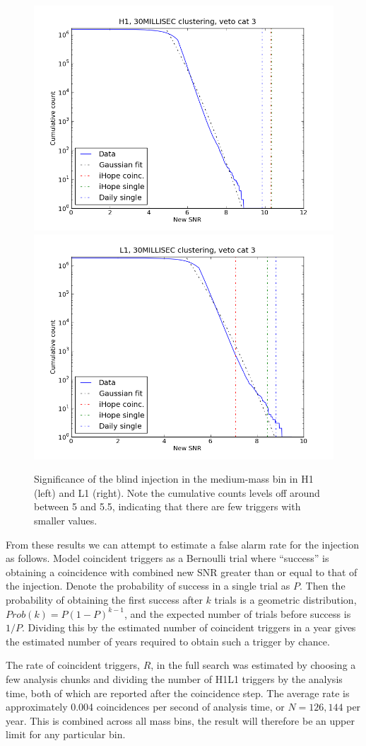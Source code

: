 \begin{figure}
  \includegraphics[width=0.5\linewidth]{figures/detchar/MM_H1_30MILLISEC_3_hist.png}
  \includegraphics[width=0.5\linewidth]{figures/detchar/MM_L1_30MILLISEC_3_hist.png}
  \caption[Significance of the injection in the medium-mass bin]{
  \label{f:daily_histogram_medium}
Significance of the blind injection in the medium-mass bin in 
H1 (left) and L1 (right).  Note the cumulative counts levels off
around between 5 and 5.5, indicating that there are few triggers with
smaller values.}
\end{figure}%

\iffalse
From these results we can attempt to estimate a false alarm rate for
the injection as follows.   Model coincident triggers as a Bernoulli
trial where ``success'' is obtaining a coincidence with combined new
SNR greater than or equal to that of the injection.  Denote the
probability of success in a single trial as $P$.  Then the probability
of obtaining the first success after $k$ trials is a geometric
distribution, $Prob(k) = P(1-P)^{k-1}$, and the expected number of
trials before success is $1/P$.  Dividing this by the estimated number
of coincident triggers in a year gives the estimated number of years
required to obtain such a trigger by chance.

The rate of coincident triggers, $R$, in the full search was estimated
by choosing a few analysis chunks and dividing the number of H1L1
triggers by the analysis time, both of which are reported after the
coincidence step.  The average rate is approximately 0.004
coincidences per second of analysis time, or $N=126,144$ per year.
This is combined across all mass bins, the result will therefore be an
upper limit for any particular bin.

